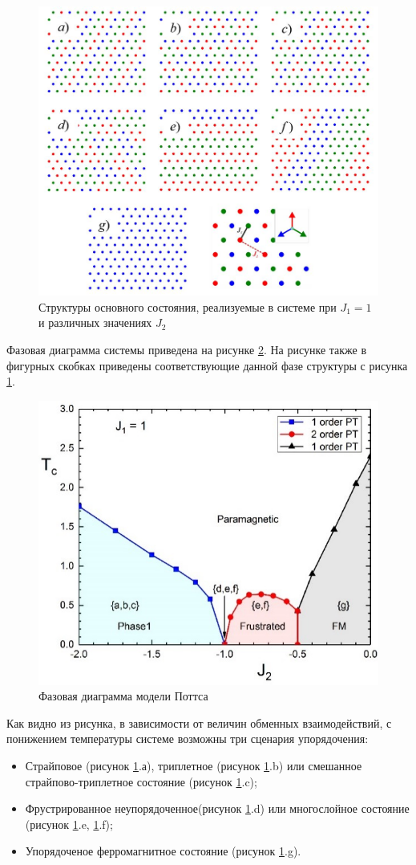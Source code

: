 \begin{figure}[H]
	\centering
	\includegraphics[width=0.5\linewidth]{content/sections/images/phys3-6}
	\caption{Структуры основного состояния, реализуемые в системе при $J_1 = 1$ и различных значениях $J_2$}
\label{phys3-pic-60}
\end{figure}

Фазовая диаграмма системы приведена на рисунке \ref{phys3-pic-70}. На рисунке также в фигурных скобках приведены соответствующие данной фазе структуры с рисунка \ref{phys3-pic-60}.

\begin{figure}[H]	
	\centering
	\includegraphics[width=0.5\linewidth]{content/sections/images/phys3-7}
	\caption{Фазовая диаграмма модели Поттса}
\label{phys3-pic-70}
\end{figure}

Как видно из рисунка, в зависимости от величин обменных взаимодействий, с понижением температуры системе возможны три сценария упорядочения:

\begin{itemize}
	\item
	Страйповое (рисунок \ref{phys3-pic-60}.а), триплетное (рисунок \ref{phys3-pic-60}.b) или смешанное \linebreak страйпово-триплетное состояние (рисунок \ref{phys3-pic-60}.c);
	
	\item
	Фрустрированное неупорядоченное(рисунок \ref{phys3-pic-60}.d) или многослойное состояние (рисунок \ref{phys3-pic-60}.e, \ref{phys3-pic-60}.f);
	
	\item
	Упорядоченое ферромагнитное состояние (рисунок \ref{phys3-pic-60}.g).
\end{itemize}

